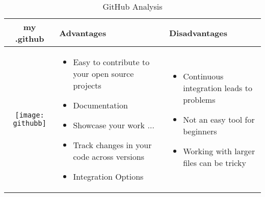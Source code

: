 \documentclass{article}
\begin{document}
	\begin{table}[h!]
		\centering
		\begin{tabular}{ | c | m{5cm} | m{5cm} | }
			\hline 
			my .github & Advantages & Disadvantages \\ 	\hline
			\begin{minipage}{.4\textwidth}
				\texttt{[image: githubb]}
			\end{minipage}
		&
		\begin{itemize}
			\item Easy to contribute to your open source projects
			\item Documentation
			\item Showcase your work $\ldots$
			\item Track changes in your code across versions
			\item Integration Options
		\end{itemize}
	&
	\begin{itemize}
		\item Continuous integration leads to problems
		\item Not an easy tool for beginners
		\item Working with larger files can be tricky
	\end{itemize}
\\ \hline
		\end{tabular}
	\caption{GitHub Analysis}
	\label{tbl:mygitHub}
	\end{table}
\end{document}

